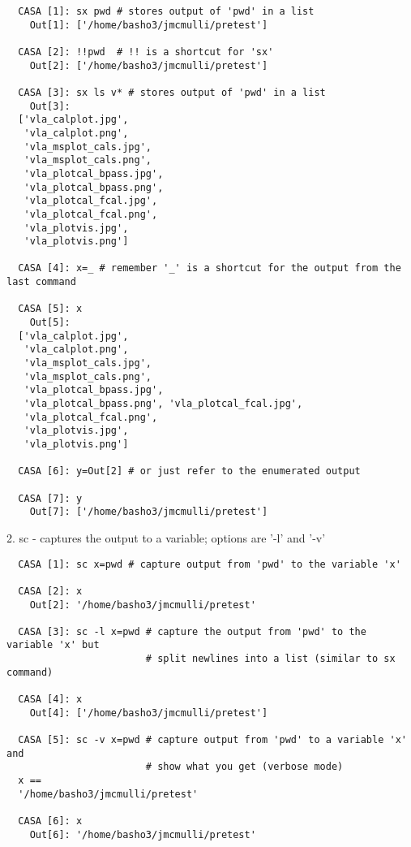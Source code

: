 \small
\begin{verbatim}
  CASA [1]: sx pwd # stores output of 'pwd' in a list
    Out[1]: ['/home/basho3/jmcmulli/pretest']

  CASA [2]: !!pwd  # !! is a shortcut for 'sx'
    Out[2]: ['/home/basho3/jmcmulli/pretest']

  CASA [3]: sx ls v* # stores output of 'pwd' in a list
    Out[3]:
  ['vla_calplot.jpg',
   'vla_calplot.png',
   'vla_msplot_cals.jpg',
   'vla_msplot_cals.png',
   'vla_plotcal_bpass.jpg',
   'vla_plotcal_bpass.png',
   'vla_plotcal_fcal.jpg',
   'vla_plotcal_fcal.png',
   'vla_plotvis.jpg',
   'vla_plotvis.png']

  CASA [4]: x=_ # remember '_' is a shortcut for the output from the last command

  CASA [5]: x
    Out[5]:
  ['vla_calplot.jpg',
   'vla_calplot.png',
   'vla_msplot_cals.jpg',
   'vla_msplot_cals.png',
   'vla_plotcal_bpass.jpg',
   'vla_plotcal_bpass.png', 'vla_plotcal_fcal.jpg',
   'vla_plotcal_fcal.png',
   'vla_plotvis.jpg',
   'vla_plotvis.png']

  CASA [6]: y=Out[2] # or just refer to the enumerated output

  CASA [7]: y
    Out[7]: ['/home/basho3/jmcmulli/pretest']
\end{verbatim}
\normalsize

2. sc - captures the output to a variable; options are '-l' and '-v' 

\small
\begin{verbatim}
  CASA [1]: sc x=pwd # capture output from 'pwd' to the variable 'x'

  CASA [2]: x
    Out[2]: '/home/basho3/jmcmulli/pretest'

  CASA [3]: sc -l x=pwd # capture the output from 'pwd' to the variable 'x' but
                        # split newlines into a list (similar to sx command)

  CASA [4]: x
    Out[4]: ['/home/basho3/jmcmulli/pretest']

  CASA [5]: sc -v x=pwd # capture output from 'pwd' to a variable 'x' and
                        # show what you get (verbose mode)
  x ==
  '/home/basho3/jmcmulli/pretest'
  
  CASA [6]: x
    Out[6]: '/home/basho3/jmcmulli/pretest'
\end{verbatim}
\normalsize

